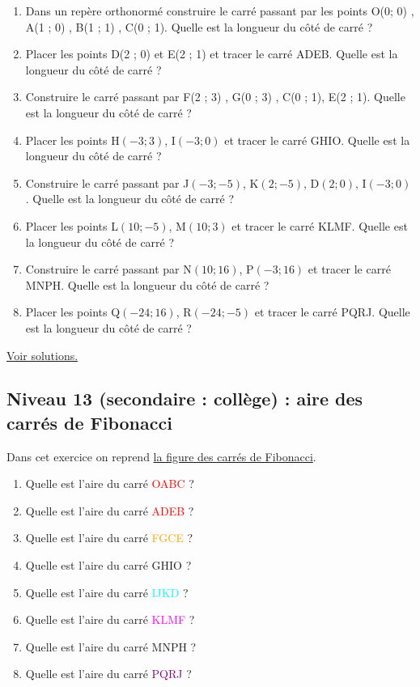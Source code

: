 \documentclass[11pt]{article}
\begin{document}
\begin{enumerate}
\item Dans un repère orthonormé construire le carré passant par les
points O(0; 0) , A(1 ; 0) , B(1 ; 1) , C(0 ; 1). Quelle est la
longueur du côté de carré ?
\item Placer les points D(2 ; 0) et E(2 ; 1) et tracer le carré
ADEB. Quelle est la longueur du côté de carré ?
\item Construire le carré passant par F(2 ; 3) , G(0 ; 3) , C(0 ; 1), E(2
; 1). Quelle est la longueur du côté de carré ?
\item Placer les points H\((-3 ; 3)\), I\((-3 ; 0)\) et tracer le carré
GHIO. Quelle est la longueur du côté de carré ?
\item Construire le carré passant par J\((-3 ; -5)\), K\((2 ; -5)\), D\((2 ;
   0)\), I\((-3 ; 0)\). Quelle est la longueur du côté de carré ?
\item Placer les points L\((10 ; -5)\), M\((10 ; 3)\) et tracer le carré
KLMF. Quelle est la longueur du côté de carré ?
\item Construire le carré passant par N\((10 ; 16)\), P\((-3 ; 16)\) et
tracer le carré MNPH. Quelle est la longueur du côté de carré ?
\item Placer les points Q\((-24 ; 16)\), R\((-24 ; -5)\) et tracer le carré
PQRJ. Quelle est la longueur du côté de carré ?
\end{enumerate}




\hyperref[org9bce7c2]{Voir solutions.}




\newpage

\subsection{Niveau 13 (secondaire : collège) : aire des carrés de Fibonacci}
\label{sec:org8824111}

\label{org99fe2c8}

Dans cet exercice on reprend \hyperref[org9bce7c2]{la figure des carrés de Fibonacci}.



\begin{enumerate}
\item Quelle est l'aire du carré \textcolor{red}{OABC} ?
\item Quelle est l'aire du carré \textcolor{red}{ADEB} ?
\item Quelle est l'aire du carré \textcolor{orange}{FGCE} ?
\item Quelle est l'aire du carré \textcolor{citron}{GHIO} ?
\item Quelle est l'aire du carré \textcolor{cyan}{IJKD} ?
\item Quelle est l'aire du carré \textcolor{magenta}{KLMF} ?
\item Quelle est l'aire du carré \textcolor{pourpre}{MNPH} ?
\item Quelle est l'aire du carré \textcolor{purple}{PQRJ} ?
\end{enumerate}
\end{document}
